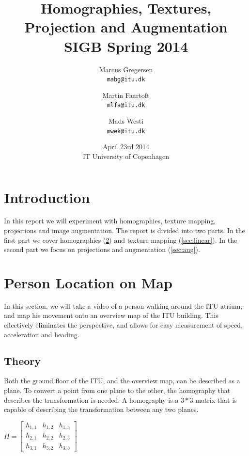 \documentclass[a4paper,11pt]{article}
\begin{document}
\date{April 23rd 2014\\ IT University of Copenhagen}
\title{Homographies, Textures, Projection and Augmentation\\SIGB Spring 2014}

\author{Marcus Gregersen\\
\texttt{mabg@itu.dk}
\and Martin Faartoft\\
\texttt{mlfa@itu.dk}
\and Mads Westi\\
\texttt{mwek@itu.dk}}
\clearpage\maketitle
\thispagestyle{empty}
\setcounter{page}{1}
\newpage

\section{Introduction}
In this report we will experiment with homographies, texture mapping, projections and image augmentation. The report is divided into two parts. In the first part we cover homographies (\ref{sec:person}) and texture mapping (\ref{sec:linear}). In the second part we focus on projections and augmentation (\ref{sec:aug}).

\section{Person Location on Map}
\label{sec:person}
In this section, we will take a video of a person walking around the ITU atrium, and map his movement onto an overview map of the ITU building. This effectively eliminates the perspective, and allows for easy measurement of speed, acceleration and heading.

\subsection{Theory}
Both the ground floor of the ITU, and the overview map, can be described as a plane. To convert a point from one plane to the other, the homography that describes the transformation is needed. A homography is a $3*3$ matrix that is capable of describing the transformation between any two planes.
\begin{center}
$H =
\begin{bmatrix}
 h_{1,1} & h_{1,2} & h_{1,3} \\
 h_{2,1} & h_{2,2} & h_{2,3} \\
 h_{3,1} & h_{3,2} & h_{3,3}
\end{bmatrix}
$
\end{center}
\end{document}
